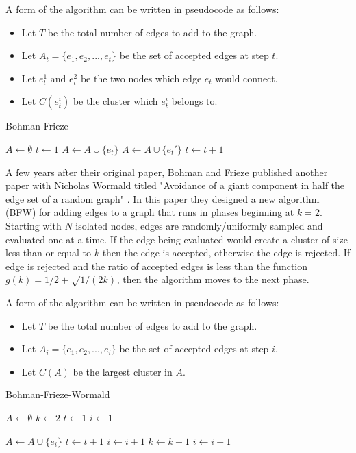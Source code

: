A form of the algorithm can be written in pseudocode as follows:
\begin{itemize}
	\item Let $T$ be the total number of edges to add to the graph.
	\item Let $A_t = \{e_1, e_2, ..., e_t\}$ be the set of accepted edges at step $t$.
	\item Let $e_t^1$ and $e_t^2$ be the two nodes which edge $e_t$ would connect.
	\item Let $C(e_t^i)$ be the cluster which $e_t^i$ belongs to.
\end{itemize}

\begin{algorithm}[H]
	\caption{Bohman-Frieze}\label{Bohman-Frieze}
	\begin{algorithmic}[1]
		\State $A \gets \emptyset$
		\State $t \gets 1$
				\State $A \gets A \cup \{e_t\}$
			\Else
				\State $A \gets A \cup \{e_t'\}$
			\EndIf
			\State $t \gets t+1$
		\EndWhile
	\EndProcedure
	\end{algorithmic}
\end{algorithm}

A few years after their original paper, Bohman and Frieze published another paper with Nicholas Wormald titled "Avoidance of a giant component in half the edge set of a random graph" \cite{BFW}.
In this paper they designed a new algorithm (BFW) for adding edges to a graph that runs in phases beginning at $k = 2$.
Starting with $N$ isolated nodes, edges are randomly/uniformly sampled and evaluated one at a time.
If the edge being evaluated would create a cluster of size less than or equal to $k$ then the edge is accepted, otherwise the edge is rejected.
If edge is rejected and the ratio of accepted edges is less than the function $g(k) = 1/2 + \sqrt{1/(2k)}$, then the algorithm moves to the next phase.

A form of the algorithm can be written in pseudocode as follows:
\begin{itemize}
	\item Let $T$ be the total number of edges to add to the graph.
	\item Let $A_i = \{e_1, e_2, ..., e_i\}$ be the set of accepted edges at step $i$.
	\item Let $C(A)$ be the largest cluster in $A$.
\end{itemize}

\begin{algorithm}[H]
	\caption{Bohman-Frieze-Wormald}\label{Bohman-Frieze-Wormald}
	\begin{algorithmic}[1]
		\State $A \gets \emptyset$
		\State $k \gets 2$
		\State $t \gets 1$
		\State $i \gets 1$

				\State $A \gets A \cup \{e_i\}$
				\State $t \gets t+1$
				\State $i \gets i+1$
				\State $k \gets k+1$
			\Else
				\State $i \gets i+1$
			\EndIf
		\EndWhile
	\EndProcedure
	\end{algorithmic}
\end{algorithm}



